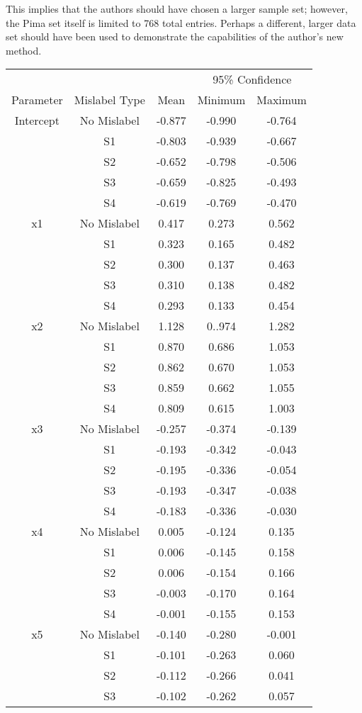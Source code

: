 \documentclass{article}
\begin{document}
This implies that the authors should have chosen a larger sample set; however, the Pima set itself is limited to 768 total entries. Perhaps a different, larger data set should have been used to demonstrate the capabilities of the author's new method. 
\vspace{8pt}
\centering
\begin{longtable}{c c c c c}
\toprule
&&&\multicolumn{2}{c}{95\% Confidence}\\
Parameter&Mislabel Type&Mean&Minimum&Maximum\\
\midrule
Intercept&No Mislabel&-0.877&-0.990&-0.764\\
&S1&-0.803&-0.939&-0.667\\
&S2&-0.652&-0.798&-0.506\\
&S3&-0.659&-0.825&-0.493\\
&S4&-0.619&-0.769&-0.470\\
\midrule
x1&No Mislabel&0.417&0.273&0.562\\
&S1&0.323&0.165&0.482\\
&S2&0.300&0.137&0.463\\
&S3&0.310&0.138&0.482\\
&S4&0.293&0.133&0.454\\
\midrule
x2&No Mislabel&1.128&0..974&1.282\\
&S1&0.870&0.686&1.053\\
&S2&0.862&0.670&1.053\\
&S3&0.859&0.662&1.055\\
&S4&0.809&0.615&1.003\\
\midrule
x3&No Mislabel&-0.257&-0.374&-0.139\\
&S1&-0.193&-0.342&-0.043\\
&S2&-0.195&-0.336&-0.054\\
&S3&-0.193&-0.347&-0.038\\
&S4&-0.183&-0.336&-0.030\\
\midrule
x4&No Mislabel&0.005&-0.124&0.135\\
&S1&0.006&-0.145&0.158\\
&S2&0.006&-0.154&0.166\\
&S3&-0.003&-0.170&0.164\\
&S4&-0.001&-0.155&0.153\\
\midrule
x5&No Mislabel&-0.140&-0.280&-0.001\\
&S1&-0.101&-0.263&0.060\\
&S2&-0.112&-0.266&0.041\\
&S3&-0.102&-0.262&0.057\\

\end{longtable}
\end{document}

